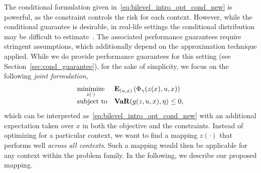 The conditional formulation given in~\eqref{eq:bilevel_intro_opt_cond_new} is powerful, as the constraint controls the risk for each context. However, while the conditional guarantee is desirable, in real-life settings the conditional distribution may be difficult to estimate~\citep{conformal}. The associated performance guarantees require stringent assumptions, which additionally depend on the approximation technique applied. While we do provide performance guarantees for this setting (see Section~\ref{sec:cond_guarantee}), for the sake of simplicity, we focus on the following {\it joint formulation},
\begin{equation}
	\label{eq:bilevel_intro_opt_cond_joint}
	\begin{array}{ll}
		\underset{z(\cdot)}{\mbox{minimize}} & \mathbf{E}_{(u,x)}\left(\Phi_\gamma(z(x),u,x)\right) \\
		\mbox{subject to} & \mathop{\bf VaR}(g(z,u,x),\eta) \leq 0,\\
	\end{array}
\end{equation}
which can be interpreted as~\eqref{eq:bilevel_intro_opt_cond_new} with an additional expectation taken over $x$ in both the objective and the constraints. Instead of optimizing for a particular context, we want to find a mapping $z(\cdot)$ that performs well {\it across all contexts}. Such a mapping would then be applicable for any context within the problem family.
In the following, we describe our proposed mapping. 

